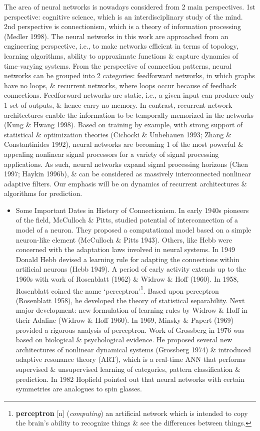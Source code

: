 \documentclass{article}
\begin{document}
\begin{enumerate}
\begin{itemize}
		The area of neural networks is nowadays considered from 2 main perspectives. 1st perspective: cognitive science, which is an interdisciplinary study of the mind. 2nd perspective is connectionism, which is a theory of information processing (Medler 1998). The neural networks in this work are approached from an engineering perspective, i.e., to make networks efficient in terms of topology, learning algorithms, ability to approximate functions \& capture dynamics of time-varying systems. From the perspective of connection patterns, neural networks can be grouped into 2 categories: feedforward networks, in which graphs have no loops, \& recurrent networks, where loops occur because of feedback connections. Feedforward networks are static, i.e., a given input can produce only 1 set of outputs, \& hence carry no memory. In contrast, recurrent network architectures enable the information to be temporally memorized in the networks (Kung \& Hwang 1998). Based on training by example, with strong support of statistical \& optimization theories (Cichocki \& Unbehauen 1993; Zhang \& Constantinides 1992), neural networks are becoming 1 of the most powerful \& appealing nonlinear signal processors for a variety of signal processing applications. As such, neural networks expand signal processing horizons (Chen 1997; Haykin 1996b), \& can be considered as massively interconnected nonlinear adaptive filters. Our emphasis will be on dynamics of recurrent architectures \& algorithms for prediction.
		\begin{itemize}
			\item {\sf Some Important Dates in History of Connectionism.} In early 1940s pioneers of the field, {\sc McCulloch \& Pitts}, studied potential of interconnection of a model of a neuron. They proposed a computational model based on a simple neuron-like element (McCulloch \& Pitts 1943). Others, like Hebb were concerned with the adaptation laws involved in neural systems. In 1949 {\sc Donald Hebb} devised a learning rule for adapting the connections within artificial neurons (Hebb 1949). A period of early activity extends up to the 1960s with work of Rosenblatt (1962) \& Widrow \& Hoﬀ (1960). In 1958, Rosenblatt coined the name `perceptron'\footnote{{\bf perceptron} [n] ({\it computing}) an artificial network which is intended to copy the brain's ability to recognize things \& see the differences between things.}. Based upon perceptron (Rosenblatt 1958), he developed the theory of statistical separability. Next major development: new formulation of learning rules by {\sc Widrow \& Hoff} in their Adaline (Widrow \& Hoﬀ 1960). In 1969, Minsky \& Papert (1969) provided a rigorous analysis of perceptron. Work of Grossberg in 1976 was based on biological \& psychological evidence. He proposed several new architectures of nonlinear dynamical systems (Grossberg 1974) \& introduced adaptive resonance theory (ART), which is a real-time ANN that performs supervised \& unsupervised learning of categories, pattern classification \& prediction. In 1982 {\sc Hopfield} pointed out that neural networks with certain symmetries are analogues to spin glasses.
			

\end{itemize}
\end{itemize}
\end{enumerate}
\end{document}

